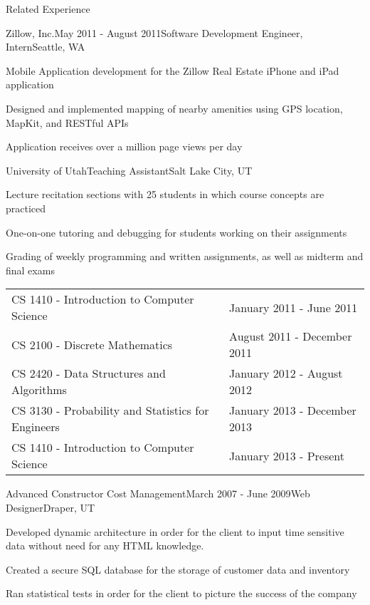 \documentclass{resume}
\begin{document}
\begin{rSection}{Related Experience}

\begin{experienceZillow}
\begin{rSubsection}{Zillow, Inc.}{May 2011 - August 2011}{Software Development Engineer, Intern}{Seattle, WA}
\item Mobile Application development for the Zillow Real Estate iPhone and iPad application
\item Designed and implemented mapping of nearby amenities using GPS location, MapKit, and RESTful APIs
\item Application receives over a million page views per day
\end{rSubsection}
\end{experienceZillow}


\begin{experienceTA}
\begin{rSubsection}{University of Utah}{}{Teaching Assistant}{Salt Lake City, UT}
\item Lecture recitation sections with 25 students in which course concepts are practiced
\item One-on-one tutoring and debugging for students working on their assignments
\item Grading of weekly programming and written assignments, as well as midterm and final exams
\\
\begin{tabularx}{\textwidth}{ X l }
CS 1410 - Introduction to Computer Science & January 2011 - June 2011 \\
CS 2100 - Discrete Mathematics & August 2011 - December 2011 \\
CS 2420 - Data Structures and Algorithms &  January 2012 - August 2012 \\
CS 3130 - Probability and Statistics for Engineers & January 2013 - December 2013 \\
CS 1410 - Introduction to Computer Science & January 2013 - Present \\
\end{tabularx}
\end{rSubsection}
\end{experienceTA}


\begin{experienceACCM}
\begin{rSubsection}{Advanced Constructor Cost Management}{March 2007 - June 2009}{Web Designer}{Draper, UT}
\item Developed dynamic architecture in order for the client to input time sensitive data without need for any HTML knowledge.
\item Created a secure SQL database for the storage of customer data and inventory
\item Ran statistical tests in order for the client to picture the success of the company
\end{rSubsection}
\end{experienceACCM}


\end{rSection}
\end{document}
